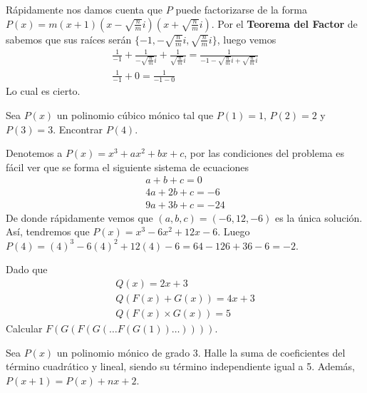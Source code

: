 {\begin{exercise}
        \solution
        {
            Rápidamente nos damos cuenta que $P$ puede factorizarse de la forma $P(x) = m(x + 1)(x - \sqrt {\frac{n}{m}}i)(x + \sqrt {\frac{n}{m}}i)$. Por el \textbf{Teorema del Factor} de \cite{TD23-clase2}
            sabemos que sus raíces serán $\{ -1, -\sqrt {\frac{n}{m}}i, \sqrt {\frac{n}{m}}i\}$, luego vemos
            \begin{gather*}
                \frac{1}{-1} + \frac{1}{-\sqrt {\frac{n}{m}}i} + \frac{1}{\sqrt {\frac{n}{m}}i} = \frac{1}{ -1 - \sqrt {\frac{n}{m}}i + \sqrt {\frac{n}{m}}i}\\
                \frac{1}{-1} + 0 = \frac{1}{ -1 - 0}
            \end{gather*}
            Lo cual es cierto.
        }
    \end{exercise}

    \begin{exercise}
        Sea $P(x)$ un polinomio cúbico mónico tal que $P(1) = 1$, $P(2) = 2$ y $P(3) = 3$. Encontrar $P(4).$

        \solution
        {
            Denotemos a $P(x) = x^3 + ax^2 + bx +  c$, por las condiciones del problema es fácil ver que se forma el siguiente sistema de ecuaciones
            \begin{align}
                a + b + c = 0 \\
                4a + 2b + c = -6 \\
                9a + 3b + c = -24
            \end{align}
            De donde rápidamente vemos que $(a, b, c) = (-6, 12, -6)$ es la única solución. Así, tendremos que $P(x) = x^3 - 6x^2 + 12x - 6$.
            Luego $P(4) = (4)^3 - 6(4)^2 + 12(4) - 6 = 64 - 126 + 36 - 6 = -2$.
        }
    \end{exercise}


    \begin{exercise}
        Dado que
        \begin{gather*}
            Q(x) = 2x + 3 \\
            Q( F(x) + G(x) ) = 4x + 3 \\
            Q( F(x) \times G(x) ) = 5
        \end{gather*}
        Calcular $F(G(F(G(\dots F(G(1))\dots))))$.
    \end{exercise}

    \begin{exercise}
        Sea $P(x)$ un polinomio mónico de grado 3. Halle la suma de coeficientes del término cuadrático y lineal, siendo su término independiente igual a 5. Además, $P(x + 1) = P(x) + nx + 2$.
    \end{exercise}

}
